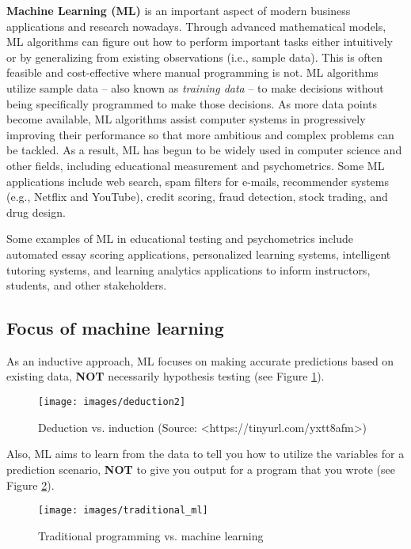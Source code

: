 \documentclass[]{book}
\begin{document}
\textbf{Machine Learning (ML)} is an important aspect of modern business applications and research nowadays. Through advanced mathematical models, ML algorithms can figure out how to perform important tasks either intuitively or by generalizing from existing observations (i.e., sample data). This is often feasible and cost-effective where manual programming is not. ML algorithms utilize sample data -- also known as \emph{training data} -- to make decisions without being specifically programmed to make those decisions. As more data points become available, ML algorithms assist computer systems in progressively improving their performance so that more ambitious and complex problems can be tackled. As a result, ML has begun to be widely used in computer science and other fields, including educational measurement and psychometrics. Some ML applications include web search, spam filters for e-mails, recommender systems (e.g., Netflix and YouTube), credit scoring, fraud detection, stock trading, and drug design.

Some examples of ML in educational testing and psychometrics include automated essay scoring applications, personalized learning systems, intelligent tutoring systems, and learning analytics applications to inform instructors, students, and other stakeholders.

\hypertarget{focus-of-machine-learning}{%
\subsection{Focus of machine learning}\label{focus-of-machine-learning}}

As an inductive approach, ML focuses on making accurate predictions based on existing data, \textbf{NOT} necessarily hypothesis testing (see Figure \ref{fig:fig5-1}).

\begin{figure}
\texttt{[image: images/deduction2]} \caption{Deduction vs. induction (Source: <https://tinyurl.com/yxtt8afm>)}\label{fig:fig5-1}
\end{figure}

Also, ML aims to learn from the data to tell you how to utilize the variables for a prediction scenario, \textbf{NOT} to give you output for a program that you wrote (see Figure \ref{fig:fig5-2}).

\begin{figure}
\texttt{[image: images/traditional\_ml]} \caption{Traditional programming vs. machine learning}\label{fig:fig5-2}
\end{figure}
\end{document}
